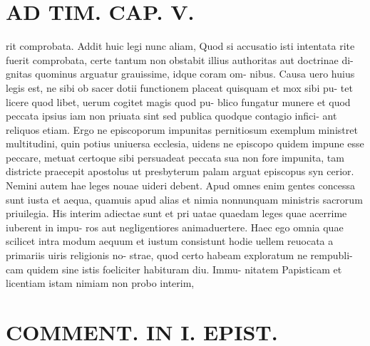 \documentclass{article}
\begin{document}
\begin{pages}
\section*{AD TIM. CAP. V. }
\marginpar{[ p.159 ]}\pstart rit comprobata. Addit huic legi nunc aliam, Quod si accusatio isti intentata rite fuerit comprobata, certe tantum non obstabit illius authoritas aut doctrinae di- gnitas quominus arguatur grauissime, idque coram om- nibus. Causa uero huius legis est, ne sibi ob sacer dotii functionem placeat quisquam et mox sibi pu- tet licere quod libet, uerum cogitet magis quod pu- blico fungatur munere et quod peccata ipsius iam non priuata sint sed publica quodque contagio infici- ant reliquos etiam. Ergo ne episcoporum impunitas pernitiosum exemplum ministret multitudini, quin potius uniuersa ecclesia, uidens ne episcopo quidem impune esse peccare, metuat certoque sibi persuadeat peccata sua non fore impunita, tam districte praecepit apostolus ut presbyterum palam arguat episcopus syn cerior. Nemini autem hae leges nouae uideri debent. Apud omnes enim gentes concessa sunt iusta et aequa, quamuis apud alias et nimia nonnunquam ministris sacrorum priuilegia. His interim adiectae sunt et pri uatae quaedam leges quae acerrime iuberent in impu- ros aut negligentiores animaduertere. Haec ego omnia quae scilicet intra modum aequum et iustum consistunt hodie uellem reuocata a primariis uiris religionis no- strae, quod certo habeam exploratum ne rempubli- cam quidem sine istis foeliciter habituram diu. Immu- nitatem Papisticam et licentiam istam nimiam non probo interim,  \pend
\section*{COMMENT. IN I. EPIST. }
{}

\end{pages}
\end{document}
